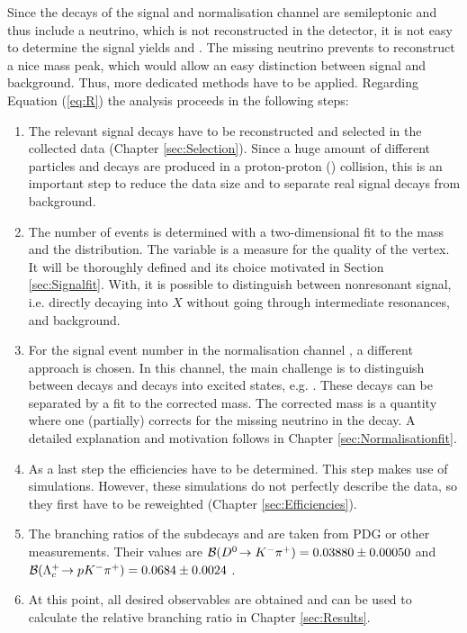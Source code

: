 Since the decays of the signal and normalisation channel are semileptonic and thus include a neutrino, which is not reconstructed in the detector, it is not easy to determine the signal yields \NDp and \NLc.
The missing neutrino prevents to reconstruct a nice \Lb mass peak, which would allow an easy distinction between signal and background.
Thus, more dedicated methods have to be applied.
Regarding Equation (\ref{eq:R}) the analysis proceeds in the following steps:
\begin{enumerate}
    \item The relevant signal decays have to be reconstructed and selected in the collected data (Chapter \ref{sec:Selection}). 
          Since a huge amount of different particles and decays are produced in a proton-proton (\proton\proton) collision, this is an important step to reduce the data size and to separate real signal decays from background.
    \item The number of \LbToDpmunuX events \NLc is determined with a two-dimensional fit to the \Dz\proton mass and the \logIP distribution.
          The variable \logIP  is a measure for the quality of the \Dz\proton\mun vertex.
          It will be thoroughly defined and its choice motivated in Section \ref{sec:Signalfit}.
          With, \logIP it is possible to distinguish between nonresonant signal, i.e. \Lb directly decaying into \Dz\proton\mun\neumb$X$ without going through intermediate resonances, and background.
    \item For the signal event number \NLc in the normalisation channel \LbToLcmunu, a different approach is chosen.
          In this channel, the main challenge is to distinguish between \LbToLcmunu decays and decays into excited \Lc states, e.g. .
          These decays can be separated by a fit to the corrected \Lb mass.
          The corrected mass is a quantity where one (partially) corrects for the missing neutrino in the decay.
          A detailed explanation and motivation follows in Chapter \ref{sec:Normalisationfit}.
    \item As a last step the efficiencies have to be determined.
          This step makes use of simulations.
          However, these simulations do not perfectly describe the data, so they first have to be reweighted (Chapter \ref{sec:Efficiencies}).
    \item The branching ratios of the subdecays \DToKpi and \LcTopKpi are taken from PDG or other measurements. 
          Their values are ${\cal B}({{D}^0}\!\rightarrow {\ensuremath{{K}^-}}{\ensuremath{{\pi}^+}}) = 0.03880 \pm 0.00050$ \cite{PDG} and ${\cal B}({{\Lambda}^+_{c}}\!\rightarrow {\ensuremath{p}}{\ensuremath{{K}^-}}{\ensuremath{{\pi}^+}}) = 0.0684 \pm 0.0024$ \cite{Belle_BR_LcTopKpi}.
    \item At this point, all desired observables are obtained and can be used to calculate the relative branching ratio \R in Chapter \ref{sec:Results}.
\end{enumerate}

